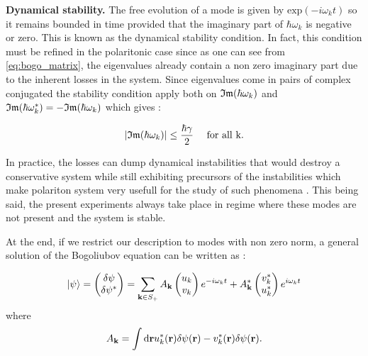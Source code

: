 \bigskip

\textbf{Dynamical stability.} The free evolution of a mode is given by $\mathrm{exp}(-i\omega_k t)$ so it remains 
bounded in time provided that the imaginary part of $\hbar\omega_k$ is negative or zero. This is known as the dynamical stability condition.
In fact, this condition must be refined in the polaritonic case since as one can see from \autoref{eq:bogo_matrix}, the eigenvalues already 
contain a non zero imaginary part due to the inherent losses in the system. Since eigenvalues come in pairs of complex conjugated the stability condition 
apply both on $\mathfrak{Im}{(\hbar\omega_k)}$ and $\mathfrak{Im}{(\hbar\omega_k^*)}=-\mathfrak{Im}{(\hbar\omega_k)}$ which gives :

\begin{equation}
    \abs{\mathfrak{Im}{(\hbar\omega_k)}} \leq \dfrac{\hbar\gamma}{2}   \ \ \ \ \mathrm{for \  all  \  k.}
\end{equation}

In practice, the losses can dump dynamical instabilities that
would destroy a conservative system while still exhibiting precursors of the instabilities which make polariton system very usefull for the study of such phenomena 
\cite{claude_high-resolution_2022}. This being said, the present experiments always take place in regime where these modes are not present and the system is stable. 

\bigskip

At the end, if we restrict our description to modes with non zero norm, a general solution of the Bogoliubov equation can be written as :


\begin{equation}
    \ket{\psi}=
    \begin{pmatrix}
    \delta\psi \\
    \delta\psi^*
    \end{pmatrix} = \sum_{\mathbf{k} \in S_+} A_{\mathbf{k}}
    \begin{pmatrix}
    u_k \\
    v_k
    \end{pmatrix}e^{-i\omega_kt}
    + A^*_{\mathbf{k}}   
     \begin{pmatrix}
        v^*_k \\
        u^*_k
        \end{pmatrix}e^{i\omega_kt}
\end{equation}
where 
\begin{equation}
    A_{\mathbf{k}} = \int \mathrm{d}\mathbf{r} u_k^*(\mathbf{r})\delta\psi(\mathbf{r})-v_k^*(\mathbf{r})\delta\psi(\mathbf{r}). 
\end{equation}

